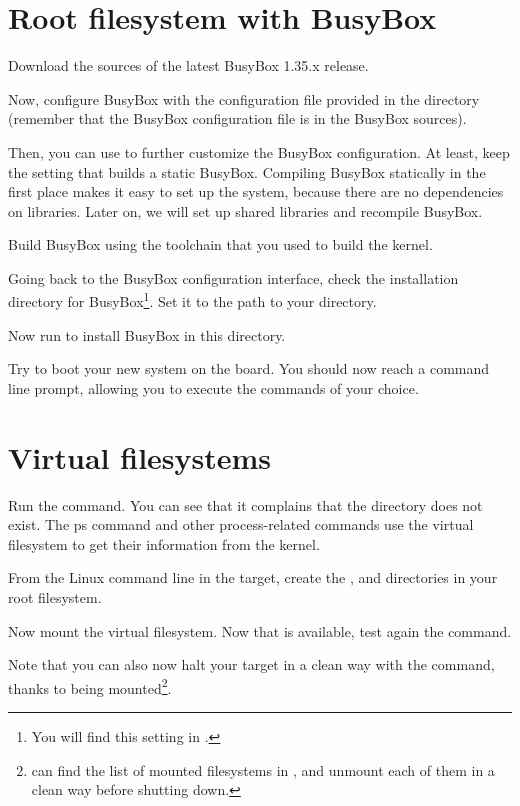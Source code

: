 \section{Root filesystem with BusyBox}

Download the sources of the latest BusyBox 1.35.x release.

Now, configure BusyBox with the configuration file provided in the
 directory (remember that the BusyBox configuration file
is  in the BusyBox sources).

Then, you can use  to further customize
the BusyBox configuration. At least, keep the setting that
builds a static BusyBox. Compiling BusyBox statically in the first
place makes it easy to set up the system, because there are no dependencies
on libraries. Later on, we will set up shared libraries and recompile BusyBox.

Build BusyBox using the toolchain that you used to build the kernel.

Going back to the BusyBox configuration interface,
check the installation directory for BusyBox\footnote{You will find
this setting in .}.
Set it to the path to your  directory.

Now run  to install BusyBox in this directory.

Try to boot your new system on the board. You should now reach a
command line prompt, allowing you to execute the commands of your
choice.

\section{Virtual filesystems}

Run the  command. You can see that it complains that the
 directory does not exist. The ps command and other
process-related commands use the  virtual filesystem to get
their information from the kernel.

From the Linux command line in the target, create the ,
 and  directories in your root filesystem.

Now mount the  virtual filesystem. Now that  is
available, test again the  command.

Note that you can also now halt your target in a clean way with the 
command, thanks to  being mounted\footnote{
can find the list of mounted filesystems in , and
unmount each of them in a clean way before shutting down.}.

